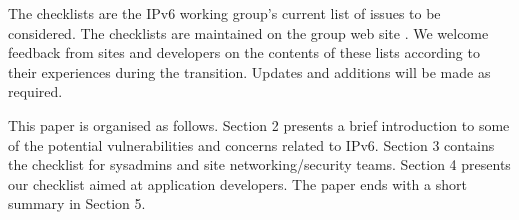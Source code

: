 The checklists are the IPv6 working group's current list of issues to be considered. The checklists are maintained on the group web site \cite {ipv6wg}. We welcome feedback from sites and developers on the contents of these lists according to their experiences during the transition. Updates and additions will be made as required.

This paper is organised as follows. Section 2 presents a brief introduction to some of the potential vulnerabilities and concerns related to IPv6. Section 3 contains the checklist for sysadmins and site networking/security teams. Section 4 presents our checklist aimed at application developers. The paper ends with a short summary in Section 5.





